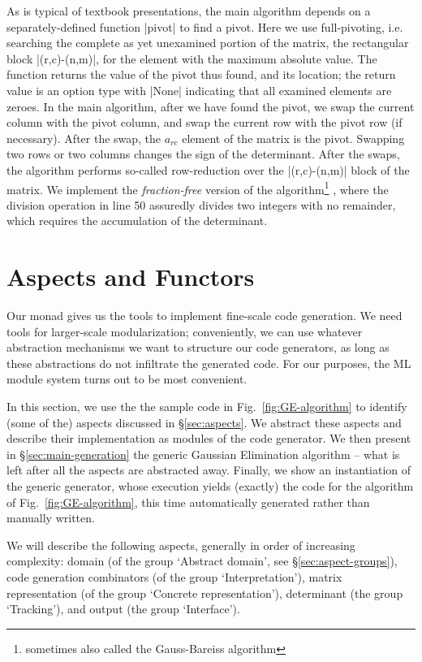 \documentclass{elsart}
\begin{document}
As is typical of textbook presentations, the main algorithm depends on
a separately-defined function |pivot| to find a pivot. Here we use
full-pivoting, i.e. searching the complete as yet unexamined portion of the
matrix, the rectangular block |(r,c)-(n,m)|, for the element with the 
maximum absolute value. The function returns the value of the
pivot thus found, and its location; the return value is an option type with
|None| indicating that all examined elements are zeroes. In the main
algorithm, after we have found the pivot, we swap the current column 
with the pivot column, and swap the current row with the pivot row (if
necessary). 
After the swap, the $a_{rc}$ element of the matrix is the pivot.
Swapping two rows or two columns changes the sign of the determinant.
After the swaps, the algorithm performs so-called row-reduction
over the |(r,c)-(n,m)| block of the matrix.
We implement the \emph{fraction-free} version of the
algorithm\footnote{sometimes also called the Gauss-Bareiss algorithm}
\cite{Bareiss68},
where the division operation in line 50 assuredly divides two integers
with no remainder, which requires the accumulation
of the determinant.

\section{Aspects and Functors}\label{functors}

Our monad gives us the tools to implement fine-scale code generation. We need
tools for larger-scale modularization; conveniently, we can use whatever
abstraction mechanisms we want to structure our code generators, as long as
these abstractions do not infiltrate the generated code. For our purposes, the
ML module system turns out to be most convenient.

In this section, we use the the sample code in
Fig.~\ref{fig:GE-algorithm} to identify (some of the) aspects
discussed in \S\ref{sec:aspects}. We abstract these aspects and
describe their implementation as modules of the code generator.  We
then present in \S\ref{sec:main-generation} the generic Gaussian
Elimination algorithm -- what is left after all the aspects are
abstracted away. Finally, we show an instantiation of the generic
generator, whose execution yields (exactly) the code for the algorithm of
Fig.~\ref{fig:GE-algorithm}, this time automatically generated rather
than manually written.

We will describe the following aspects, generally in
order of increasing complexity: domain (of the group `Abstract
domain', see \S\ref{sec:aspect-groups}), code generation combinators
(of the group `Interpretation'), matrix representation (of the group
`Concrete representation'), determinant (the group `Tracking'), and
output (the group `Interface').
\end{document}

